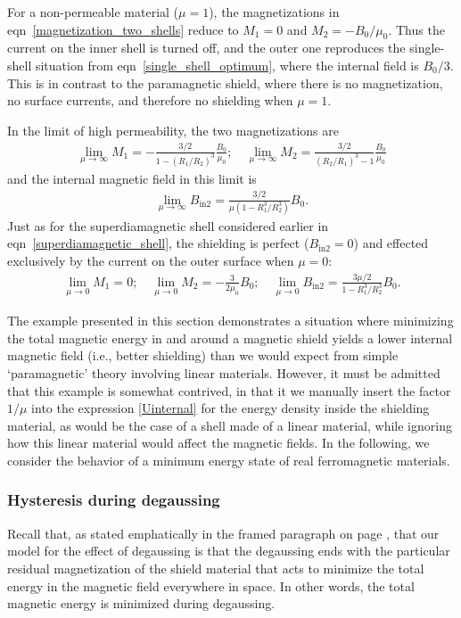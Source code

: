 For a non-permeable material ($\mu=1$), the magnetizations in
eqn~\ref{magnetization_two_shells} reduce to $M_1=0$ and $M_2=-B_0/\mu_0$. Thus
the current on the inner shell is turned off, and the outer one reproduces the
single-shell situation from eqn~\ref{single_shell_optimum}, where the internal
field is $B_0/3$. This is in contrast to the paramagnetic shield, where there is
no magnetization, no surface currents, and therefore no shielding when $\mu=1$.

In the limit of high permeability, the two magnetizations are
%
\begin{align}
   \lim_{\mu\to\infty}M_1=-\frac{3/2}{1-(R_1/R_2)^3}\frac{B_0}{\mu_0};\quad
   \lim_{\mu\to\infty}M_2=\frac{3/2}{(R_2/R_1)^3-1}\frac{B_0}{\mu_0}
\end{align}
%
and the internal magnetic field in this limit is
%
\begin{align*}
   \lim_{\mu\to\infty}B_\text{in2}=\frac{3/2}{\mu(1-R_1^3/R_2^3)}B_0.
\end{align*}
%
Just as for the superdiamagnetic shell considered earlier in
eqn~\ref{superdiamagnetic_shell}, the shielding is perfect ($B_\text{in2}=0$)
and effected exclusively by the current on the outer surface when $\mu=0$:
%
\begin{align}
   \lim_{\mu\to0}M_1=0;\quad
   \lim_{\mu\to0}M_2=-\frac{3}{2\mu_0}B_0;\quad
   \lim_{\mu\to0}B_\text{in2}=\frac{3\mu/2}{1-R_1^3/R_2^3}B_0.
\end{align}

The example presented in this section demonstrates a situation where minimizing
the total magnetic energy in and around a magnetic shield yields a lower
internal magnetic field (i.e., better shielding) than we would expect from
simple `paramagnetic' theory involving linear materials. However, it must be
admitted that this example is somewhat contrived, in that it we manually insert
the factor $1/\mu$ into the expression \ref{Uinternal} for the energy density
inside the shielding material, as would be the case of a shell made of a linear
material, while ignoring how this linear material would affect the magnetic
fields. In the following, we consider the behavior of a minimum energy state of
real ferromagnetic materials.

\subsubsection{Hysteresis during degaussing}
\label{degaussing_hysteresis}

Recall that, as stated emphatically in the framed paragraph on page
\pageref{framed_principle}, that our model for the effect of degaussing is that
the degaussing ends with the particular residual magnetization of the shield
material that acts to minimize the total energy in the magnetic field everywhere
in space. In other words, the total magnetic energy is minimized during
degaussing.

